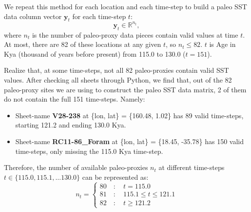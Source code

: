 \documentclass{article}
\begin{document}
We repeat this method for each location and each time-step to build a paleo SST data column vector $\textbf{y}_t$ for each time-step $t$:
$$\textbf{y}_t \in \mathbb{R}^{n_t},$$
where $n_t$ is the number of paleo-proxy data pieces contain valid values at time $t$. At most, there are 82 of these locations at any given $t$, so $n_t \leq 82$. 
$t$ is Age in Kya (thousand of years before present) from 115.0 to 130.0 ($t=151$).

Realize that, at some time-steps, not all 82 paleo-proxies contain valid SST values.
After checking all sheets through Python, we find that, out of the 82 paleo-proxy sites we are using to construct the paleo SST data matrix, 2 of them do not contain the full 151 time-steps. Namely:
    \begin{itemize}
        \item Sheet-name \textbf{V28-238} at \{lon, lat\} = \{160.48, 1.02\} has 89 valid time-steps, starting 121.2 and ending 130.0 Kya. 
        \item Sheet-name \textbf{RC11-86\_Foram} at \{lon, lat\} = \{18.45, -35.78\} has 150 valid time-steps, only missing the 115.0 Kya time-step. 
    \end{itemize}
Therefore, the number of available paleo-proxies $n_t$ at different time-steps $t \in \{115.0, 115.1, \dots 130.0\}$ can be represented as:
$$n_t = \begin{cases}
    80 \quad: \quad t = 115.0 \\
    81 \quad : \quad 115.1 \leq t \leq 121.1 \\
    82 \quad : \quad t \geq 121.2
    \end{cases}$$


\end{document}
